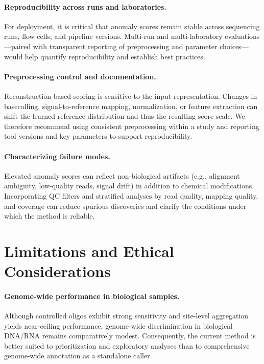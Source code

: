 \documentclass[sigconf, review]{acmart}
\begin{document}
\paragraph{Reproducibility across runs and laboratories.}
For deployment, it is critical that anomaly scores remain stable across sequencing runs, flow cells, and pipeline versions. Multi-run and multi-laboratory evaluations—paired with transparent reporting of preprocessing and parameter choices—would help quantify reproducibility and establish best practices.

\paragraph{Preprocessing control and documentation.}
Reconstruction-based scoring is sensitive to the input representation. Changes in basecalling, signal-to-reference mapping, normalization, or feature extraction can shift the learned reference distribution and thus the resulting score scale. We therefore recommend using consistent preprocessing within a study and reporting tool versions and key parameters to support reproducibility.

\paragraph{Characterizing failure modes.}
Elevated anomaly scores can reflect non-biological artifacts (e.g., alignment ambiguity, low-quality reads, signal drift) in addition to chemical modifications. Incorporating QC filters and stratified analyses by read quality, mapping quality, and coverage can reduce spurious discoveries and clarify the conditions under which the method is reliable.

\section{Limitations and Ethical Considerations}
\paragraph{Genome-wide performance in biological samples.}
Although controlled oligos exhibit strong sensitivity and site-level aggregation yields near-ceiling performance, genome-wide discrimination in biological DNA/RNA remains comparatively modest. Consequently, the current method is better suited to prioritization and exploratory analyses than to comprehensive genome-wide annotation as a standalone caller.
\end{document}

